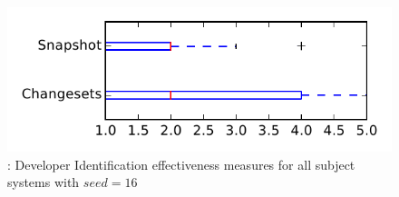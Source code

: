 
\begin{figure}
\centering
\includegraphics[height=0.4\textheight]{figures/dit_seed/rq1_tiny_16}
\caption{\rtwo: Developer Identification effectiveness measures for all subject systems with $seed=16$}
\label{fig:dit_seed:rq1:tiny}
\end{figure}
